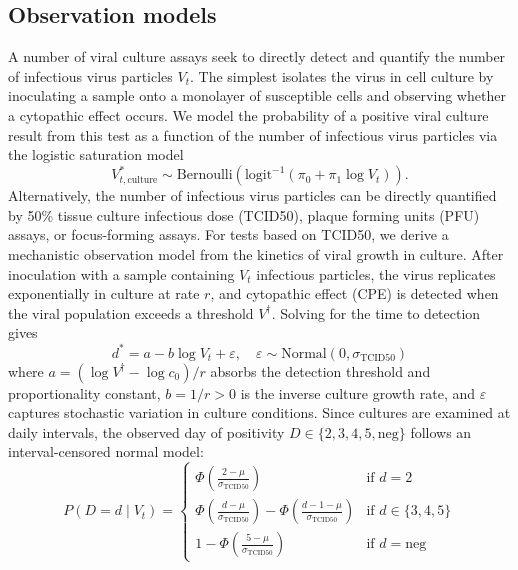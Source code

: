 \documentclass[11pt]{article}
\begin{document}
\subsection{Observation models}
A number of viral culture assays seek to directly detect and quantify the number of infectious virus particles $V_t$. The simplest isolates the virus in cell culture by inoculating a sample onto a monolayer of susceptible cells and observing whether a cytopathic effect occurs. We model the probability of a positive viral culture result from this test as a function of the number of infectious virus particles via the logistic saturation model
\begin{equation*}
    V^{*}_{t,\text{culture}} \sim \text{Bernoulli}(\text{logit}^{-1}(\pi_0 + \pi_1 \log V_t)).
\end{equation*}
Alternatively, the number of infectious virus particles can be directly quantified by 50\% tissue culture infectious dose (TCID50), plaque forming units (PFU) assays, or focus-forming assays. For tests based on TCID50, we derive a mechanistic observation model from the kinetics of viral growth in culture. After inoculation with a sample containing $V_t$ infectious particles, the virus replicates exponentially in culture at rate $r$, and cytopathic effect (CPE) is detected when the viral population exceeds a threshold $V^{\dagger}$. Solving for the time to detection gives
\begin{equation*}
    d^{*} = a - b \log V_t + \varepsilon, \quad \varepsilon \sim \text{Normal}(0, \sigma_{\text{TCID50}})
\end{equation*}
where $a = (\log V^{\dagger} - \log c_0)/r$ absorbs the detection threshold and proportionality constant, $b = 1/r > 0$ is the inverse culture growth rate, and $\varepsilon$ captures stochastic variation in culture conditions. Since cultures are examined at daily intervals, the observed day of positivity $D \in \{2, 3, 4, 5, \text{neg}\}$ follows an interval-censored normal model:
\begin{equation*}
    P(D = d \mid V_t) = \begin{cases}
        \Phi\!\left(\frac{2 - \mu}{\sigma_{\text{TCID50}}}\right) & \text{if } d = 2 \\[4pt]
        \Phi\!\left(\frac{d - \mu}{\sigma_{\text{TCID50}}}\right) - \Phi\!\left(\frac{d - 1 - \mu}{\sigma_{\text{TCID50}}}\right) & \text{if } d \in \{3, 4, 5\} \\[4pt]
        1 - \Phi\!\left(\frac{5 - \mu}{\sigma_{\text{TCID50}}}\right) & \text{if } d = \text{neg}
    \end{cases}
\end{equation*}
\end{document}
